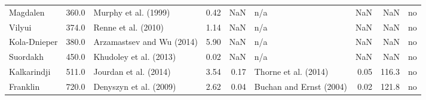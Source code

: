 \begin{tabular}{lrlrrlrrl}
            Magdalen &  360.0 &         Murphy et al. (1999) &                0.42 &                NaN &                                               n/a &               NaN &        NaN &       no \\
              Vilyui &  374.0 &          Renne et al. (2010) &                1.14 &                NaN &                                               n/a &               NaN &        NaN &       no \\
        Kola-Dnieper &  380.0 &    Arzamastsev and Wu (2014) &                5.90 &                NaN &                                               n/a &               NaN &        NaN &       no \\
            Suordakh &  450.0 &       Khudoley et al. (2013) &                0.02 &                NaN &                                               n/a &               NaN &        NaN &       no \\
         Kalkarindji &  511.0 &        Jourdan et al. (2014) &                3.54 &               0.17 &                              Thorne et al. (2014) &              0.05 &      116.3 &       no \\
            Franklin &  720.0 &       Denyszyn et al. (2009) &                2.62 &               0.04 &                           Buchan and Ernst (2004) &              0.02 &      121.8 &       no \\
\bottomrule
\end{tabular}
